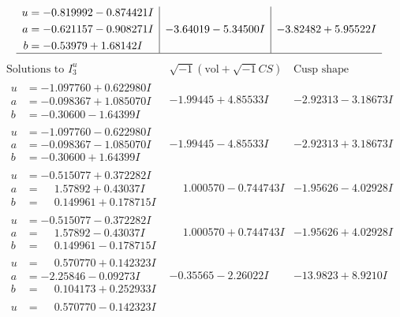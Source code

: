 \documentclass[1p]{elsarticle_modified}
\theoremstyle{definition}
\newcommand{\I}{\sqrt{-1}}
\begin{document}
$$\begin{array}{c|c|c}
\begin{aligned}
u &= -0.819992 - 0.874421 I \\
a &= -0.621157 - 0.908271 I \\
b &= -0.53979 + 1.68142 I\end{aligned}
 & -3.64019 - 5.34500 I & -3.82482 + 5.95522 I\\
 \hline 
 \end{array}$$\newpage$$\begin{array}{c|c|c}  
\text{Solutions to }I^u_{3}& \I (\text{vol} + \sqrt{-1}CS) & \text{Cusp shape}\\
 \hline 
\begin{aligned}
u &= -1.097760 + 0.622980 I \\
a &= -0.098367 + 1.085070 I \\
b &= -0.30600 - 1.64399 I\end{aligned}
 & -1.99445 + 4.85533 I & -2.92313 - 3.18673 I \\ \hline\begin{aligned}
u &= -1.097760 - 0.622980 I \\
a &= -0.098367 - 1.085070 I \\
b &= -0.30600 + 1.64399 I\end{aligned}
 & -1.99445 - 4.85533 I & -2.92313 + 3.18673 I \\ \hline\begin{aligned}
u &= -0.515077 + 0.372282 I \\
a &= \phantom{-}1.57892 + 0.43037 I \\
b &= \phantom{-}0.149961 + 0.178715 I\end{aligned}
 & \phantom{-}1.000570 - 0.744743 I & -1.95626 - 4.02928 I \\ \hline\begin{aligned}
u &= -0.515077 - 0.372282 I \\
a &= \phantom{-}1.57892 - 0.43037 I \\
b &= \phantom{-}0.149961 - 0.178715 I\end{aligned}
 & \phantom{-}1.000570 + 0.744743 I & -1.95626 + 4.02928 I \\ \hline\begin{aligned}
u &= \phantom{-}0.570770 + 0.142323 I \\
a &= -2.25846 - 0.09273 I \\
b &= \phantom{-}0.104173 + 0.252933 I\end{aligned}
 & -0.35565 - 2.26022 I & -13.9823 + 8.9210 I \\ \hline\begin{aligned}
u &= \phantom{-}0.570770 - 0.142323 I \\

\end{aligned}
\end{array}$$
\end{document}
